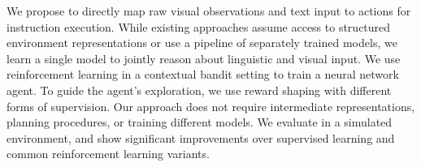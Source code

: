 We propose to directly map raw visual observations and text input to actions for instruction execution. While existing approaches assume access to structured environment representations or use a pipeline of separately trained models, we learn a single model to jointly reason about linguistic and visual input. We use reinforcement learning in a contextual bandit setting to train a neural network agent. To guide the agent's exploration, we use reward shaping with different forms of supervision. Our approach does not require intermediate representations, planning procedures, or training different models. We evaluate in a simulated environment, and show significant improvements over supervised learning and common reinforcement learning variants.
